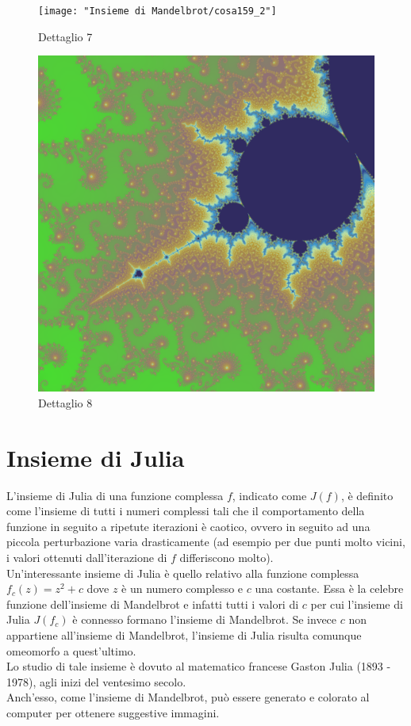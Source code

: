 \documentclass[10pt]{report}
\begin{document}
				\begin{figure}[H]
					\centering
					\texttt{[image: "Insieme di Mandelbrot/cosa159\_2"]}
					\caption*{ \footnotesize{Dettaglio 7} }
					\label{fig:detail7}
					\endminipage \hfill
					\centering
					\includegraphics[width=0.5\linewidth]{"Insieme di Mandelbrot/detail10"}
					\caption*{ \footnotesize{Dettaglio 8} }
					\label{fig:detail8}
					\endminipage \hfill
				\end{figure}

		\section{Insieme di Julia}
			L'insieme di Julia di una funzione complessa $f$, indicato come $J(f)$, è definito come l'insieme di tutti i numeri complessi tali che il comportamento della funzione in seguito a ripetute iterazioni è caotico, ovvero in seguito ad una piccola perturbazione varia drasticamente (ad esempio per due punti molto vicini, i valori ottenuti dall'iterazione di $f$ differiscono molto).\\
			Un'interessante insieme di Julia è quello relativo alla funzione complessa $f_c(z) = z^2 + c$ dove $z$ è un numero complesso e $c$ una costante. Essa è la celebre funzione dell'insieme di Mandelbrot e infatti tutti i valori di $c$ per cui l'insieme di Julia $J(f_c)$ è connesso formano l'insieme di Mandelbrot. Se invece $c$ non appartiene all'insieme di Mandelbrot, l'insieme di Julia risulta comunque omeomorfo a quest'ultimo.\\
			Lo studio di tale insieme è dovuto al matematico francese Gaston Julia (1893 - 1978), agli inizi del ventesimo secolo.\\
			Anch'esso, come l'insieme di Mandelbrot, può essere generato e colorato al computer per ottenere suggestive immagini.
\end{document}
